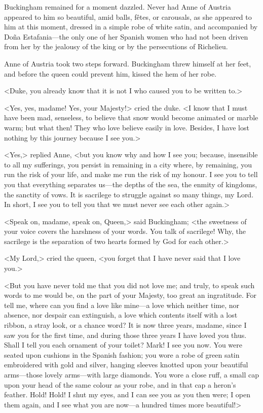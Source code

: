 Buckingham remained for a moment dazzled. Never had Anne of Austria appeared to him so beautiful, amid balls, fêtes, or carousals, as she appeared to him at this moment, dressed in a simple robe of white satin, and accompanied by Doña Estafania—the only one of her Spanish women who had not been driven from her by the jealousy of the king or by the persecutions of Richelieu. 

Anne of Austria took two steps forward. Buckingham threw himself at her feet, and before the queen could prevent him, kissed the hem of her robe. 

<Duke, you already know that it is not I who caused you to be written to.> 

<Yes, yes, madame! Yes, your Majesty!> cried the duke. <I know that I must have been mad, senseless, to believe that snow would become animated or marble warm; but what then! They who love believe easily in love. Besides, I have lost nothing by this journey because I see you.> 

<Yes,> replied Anne, <but you know why and how I see you; because, insensible to all my sufferings, you persist in remaining in a city where, by remaining, you run the risk of your life, and make me run the risk of my honour. I see you to tell you that everything separates us—the depths of the sea, the enmity of kingdoms, the sanctity of vows. It is sacrilege to struggle against so many things, my Lord. In short, I see you to tell you that we must never see each other again.> 

<Speak on, madame, speak on, Queen,> said Buckingham; <the sweetness of your voice covers the harshness of your words. You talk of sacrilege! Why, the sacrilege is the separation of two hearts formed by God for each other.> 

<My Lord,> cried the queen, <you forget that I have never said that I love you.> 

<But you have never told me that you did not love me; and truly, to speak such words to me would be, on the part of your Majesty, too great an ingratitude. For tell me, where can you find a love like mine—a love which neither time, nor absence, nor despair can extinguish, a love which contents itself with a lost ribbon, a stray look, or a chance word? It is now three years, madame, since I saw you for the first time, and during those three years I have loved you thus. Shall I tell you each ornament of your toilet? Mark! I see you now. You were seated upon cushions in the Spanish fashion; you wore a robe of green satin embroidered with gold and silver, hanging sleeves knotted upon your beautiful arms—those lovely arms—with large diamonds. You wore a close ruff, a small cap upon your head of the same colour as your robe, and in that cap a heron's feather. Hold! Hold! I shut my eyes, and I can see you as you then were; I open them again, and I see what you are now—a hundred times more beautiful!> 


